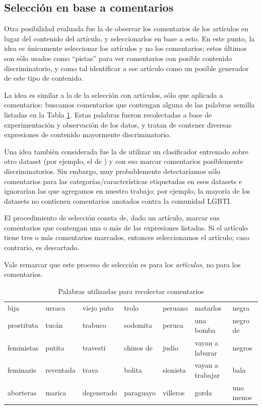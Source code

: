\subsection{Selección en base a comentarios}

Otra posibilidad evaluada fue la de observar los comentarios de los artículos en lugar del contenido del artículo, y seleccionarlos en base a esto. En este punto, la idea es únicamente seleccionar los artículos y no los comentarios; estos últimos son sólo usados como ``pistas'' para ver comentarios con posible contenido discriminatorio, y como tal identificar a ese artículo como un posible generador de este tipo de contenido.

La idea es similar a la de la selección con artículos, sólo que aplicada a comentarios: buscamos comentarios que contengan alguna de las palabras semilla listadas en la Tabla \ref{tab:palabras_comentarios}. Estas palabras fueron recolectadas a base de experimentación y observación de los datos, y tratan de contener diversas expresiones de contenido mayormente discriminatorio.

Una idea también considerada fue la de utilizar un clasificador entrenado sobre otro dataset (por ejemplo, el de \citet{hateval2019semeval}) y con eso marcar comentarios posiblemente discriminatorios. Sin embargo, muy probablemente detectaríamos sólo comentarios para las categorías/características etiquetadas en esos datasets e ignorarían las que agregamos en nuestro trabajo; por ejemplo, la mayoría de los datasets no contienen comentarios anotados contra la comunidad LGBTI.

El procedimiento de selección consta de, dado un artículo, marcar sus comentarios que contengan una o más de las expresiones listadas. Si el artículo tiene tres o más comentarios marcados, entonces seleccionamos el artículo; caso contrario, es descartado.


Vale remarcar que este proceso de selección es para los \emph{artículos}, no para los comentarios.

\begin{table}[t!]
    \centering
    \begin{tabular}{l|l|l|l|l|l|l}
    bija          & urraca     & viejo puto    & trolo      & peruano  & matarlos         & negra      \\
    prostituta    & tucán      & trabuco       & sodomita   & peruca   & una bomba        & negro de   \\
    feministas    & putita     & travesti      & chinos de  & judío    & vayan a laburar  & negros     \\
    feminazis     & reventada  & trava         & bolita     & sionista & vayan a trabajar & bala       \\
    aborteras     & marica     & degenerado    & paraguayo  & villeros & gorda            & uno menos  \\
    \end{tabular}
    \caption{Palabras utilizadas para recolectar comentarios}
    \label{tab:palabras_comentarios}
\end{table}

